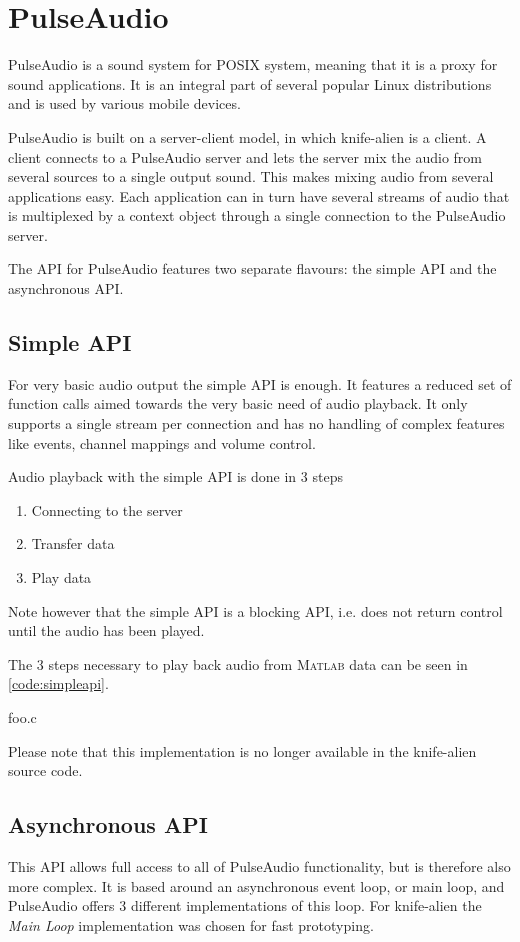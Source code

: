 \documentclass[journal]{IEEEtran}
\begin{document}
\section{PulseAudio}
\label{sec:pulseaudio}
PulseAudio is a sound system for POSIX system, meaning that it is a proxy for sound applications. It is an integral part of several popular Linux distributions and is used by various mobile devices.

PulseAudio is built on a server-client model, in which knife-alien is a client. A client connects to a PulseAudio server and lets the server mix the audio from several sources to a single output sound. This makes mixing audio from several applications easy. Each application can in turn have several streams of audio that is multiplexed by a context object through a single connection to the PulseAudio server.

The API for PulseAudio features two separate flavours: the simple API and the asynchronous API.

\subsection{Simple API}
For very basic audio output the simple API is enough. It features a reduced set of function calls aimed towards the very basic need of audio playback. It only supports a single stream per connection and has no handling of complex features like events, channel mappings and volume control.

Audio playback with the simple API is done in 3 steps
\begin{enumerate}
\item Connecting to the server
\item Transfer data
\item Play data
\end{enumerate}

Note however that the simple API is a blocking API, i.e. does not return control until the audio has been played.

The 3 steps necessary to play back audio from \textsc{Matlab} data can be seen in \autoref*{code:simpleapi}.


{foo.c}

Please note that this implementation is no longer available in the knife-alien source code.

\subsection{Asynchronous API}
This API allows full access to all of PulseAudio functionality, but is therefore also more complex. It is based around an asynchronous event loop, or main loop, and PulseAudio offers 3 different implementations of this loop. For knife-alien the \emph{Main Loop} implementation was chosen for fast prototyping.
\end{document}
